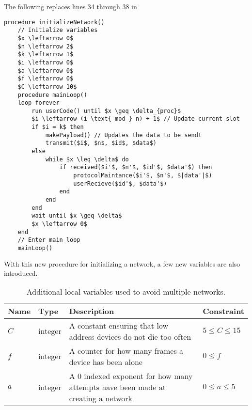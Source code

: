 The following replaces lines 34 through 38 in 

\begin{lstlisting}[label=lst:networkMultiConnectCCRC,style=pseudocode,mathescape=true,caption={Pseudocode example of the procedure initializeNetwork() for CCRC with multiconnect}]
procedure initializeNetwork()
    // Initialize variables
    $x \leftarrow 0$
    $n \leftarrow 2$
    $k \leftarrow 1$
    $i \leftarrow 0$
    $a \leftarrow 0$
    $f \leftarrow 0$
    $C \leftarrow 10$
    procedure mainLoop()
    loop forever
        run userCode() until $x \geq \delta_{proc}$
        $i \leftarrow (i \text{ mod } n) + 1$ // Update current slot
        if $i = k$ then
            makePayload() // Updates the data to be sendt
            transmit($i$, $n$, $id$, $data$)
        else
            while $x \leq \delta$ do
                if received($i'$, $n'$, $id'$, $data'$) then
                    protocolMaintance($i'$, $n'$, $|data'|$)
                    userRecieve($id'$, $data'$)
                end
            end
        end
        wait until $x \geq \delta$
        $x \leftarrow 0$ 
    end
    // Enter main loop
    mainLoop()
\end{lstlisting}

With this new procedure for initializing a network, a few new variables are also introduced.
\begin{table}[h]
    {\setlength{\extrarowheight}{1ex}%
    \begin{tabularx}{\textwidth}{l|l|X|l}
        \toprule
        Name                & Type      & Description & Constraint \\
        \midrule
        $C$                 & integer   & A constant ensuring that low address devices do not die too often  & $5 \leq C \leq 15$      \\
        $f$                 & integer   & A counter for how many frames a device has been alone              & $0 \leq f$  \\
        $a$                 & integer   & A 0 indexed exponent for how many attempts have been made at creating a network & $0 \leq a \leq 5$     \\
        \bottomrule
    \end{tabularx}}
    \caption{Additional local variables used to avoid multiple networks.}
    \label{tab:locals_wmulticonnect}
\end{table}